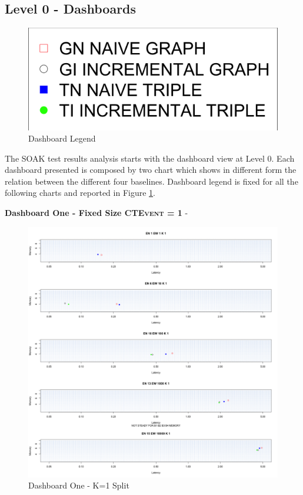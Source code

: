\subsection{Level 0 - Dashboards}\label{sec:eval-level0}

\begin{figure}[tbh]
	\centering
	\includegraphics[width=0.25\linewidth]{images/dashboard-legend}	
	\caption{Dashboard Legend} 
	\label{fig:dashboard-legend}
\end{figure}

The SOAK test results analysis starts with the dashboard view at Level 0. Each dashboard presented is composed by two chart which shows in different form the relation between the different four baselines. Dashboard legend is fixed for all the following charts and reported in Figure \ref{fig:dashboard-legend}.

\textbf{Dashboard One - Fixed Size \textsc{CTEvent} = 1} - 

\begin{figure}[htb]
	\centering
	\includegraphics[width=0.90\linewidth]{images/dashboard-1-split}	
	\caption{Dashboard One - K=1 Split} 
	\label{fig:result_dashboard_ka}
\end{figure}

